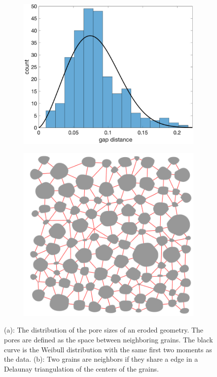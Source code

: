 \documentclass[preprint,10pt]{elsarticle}
\begin{document}
\begin{figure}[H]
\begin{subfigure}[b]{0.5\textwidth}
\includegraphics*[height = 0.8\linewidth]{./figs/gap_hist100b100}
\caption{}
\end{subfigure}
\begin{subfigure}[b]{0.5\textwidth}
\includegraphics*[height =0.8\linewidth]{./figs/triangulation_100b100}
\caption{}
\end{subfigure}
\caption{\label{fig:Eroding100gap} (a): The distribution of the pore
sizes of an eroded geometry. The pores are defined as the space between
neighboring grains.  The black curve is the Weibull distribution with
the same first two moments as the data. (b): Two grains are neighbors if
they share a edge in a Delaunay triangulation of the centers of the
grains.}
\end{figure}
\end{document}
